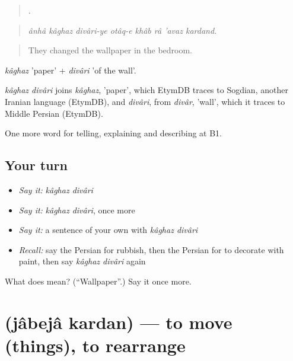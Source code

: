 \begin{quote}
       .
\end{quote}

\begin{quote}
\emph{ânhâ kâghaz divâri-ye otâq-e khâb râ 'avaz kardand.}
\end{quote}

\begin{quote}
They changed the wallpaper in the bedroom.
\end{quote}

\emph{kâghaz} 'paper' + \emph{divâri} 'of the wall'.

\begin{cousinweb}
\emph{kâghaz divâri} joins \emph{kâghaz}, 'paper', which EtymDB traces to Sogdian, another Iranian language (EtymDB), and \emph{divâri}, from \emph{divâr}, 'wall', which it traces to Middle Persian (EtymDB).
\end{cousinweb}

\begin{grammarlens}[title={What you've built}]
One more word for telling, explaining and describing at B1.
\end{grammarlens}

\subsection*{Your turn}
\begin{itemize}
\raggedright
  \item \emph{Say it:} \emph{kâghaz divâri}
  \item \emph{Say it:} \emph{kâghaz divâri}, once more
  \item \emph{Say it:} a sentence of your own with \emph{kâghaz divâri}
  \item \emph{Recall:} say the Persian for rubbish, then the Persian for to decorate with paint, then say \emph{kâghaz divâri} again
\end{itemize}

\begin{tcolorbox}[breakable,colback=teal!4,colframe=teal!35!black,title={Before you move on}]
What does   mean? (\textquotedblleft{}Wallpaper\textquotedblright{}.) Say it once more.
\end{tcolorbox}
\section[\texorpdfstring{\fa{جابجا} \fa{کردن} (jâbejâ kardan)}{جابجا کردن (jâbejâ kardan)}]{  (jâbejâ kardan) — to move (things), to rearrange}


